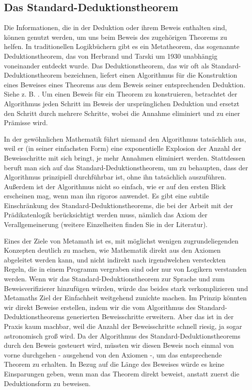 \subsection{Das Standard-Deduktionstheorem}\label{standarddeductiontheorem}

Die Informationen, die in der Deduktion oder ihrem Beweis enthalten sind, können genutzt werden, um uns beim Beweis des zugehörigen Theorems zu helfen. In traditionellen Logikbüchern gibt es ein Metatheorem, das sogenannte Deduktionstheorem, das von Herbrand und Tarski um 1930 unabhängig voneinander entdeckt wurde. Das Deduktionstheorem, das wir oft als Standard-Deduktionstheorem bezeichnen, liefert einen Algorithmus für die Konstruktion eines Beweises eines Theorems aus dem Beweis seiner entsprechenden Deduktion. Siehe z. B. \cite[S.~56]{Margaris}. Um einen Beweis für ein Theorem zu konstruieren, betrachtet der Algorithmus jeden Schritt im Beweis der ursprünglichen Deduktion und ersetzt den Schritt durch mehrere Schritte, wobei die Annahme eliminiert und zu einer Prämisse wird.

In der gewöhnlichen Mathematik führt niemand den Algorithmus tatsäch\-lich aus, weil er (in seiner einfachsten Form) eine exponentielle Explosion der Anzahl der Beweisschritte mit sich bringt, je mehr Annahmen eliminiert werden. Stattdessen beruft man sich auf das Standard-Deduktionstheorem, um zu behaupten, dass der Algorithmus prinzipiell durchführbar ist, ohne ihn tatsächlich auszuführen. Außerdem ist der Algorithmus nicht so einfach, wie er auf den ersten Blick erscheinen mag, wenn man ihn rigoros anwendet. Es gibt eine subtile Einschränkung des Standard-Deduktionstheorems, die bei der Arbeit mit der Prädikatenlogik berücksichtigt werden muss, nämlich das Axiom der Verallgemeinerung (weitere Einzelheiten finden Sie in der Literatur).

Eines der Ziele von Metamath ist es, mit möglichst wenigen zugrundeliegenden Konzepten deutlich zu machen, wie Mathematik direkt aus den Axiomen abgeleitet werden kann, und nicht indirekt nach irgendwelchen versteckten Regeln, die in einem Programm vergraben sind oder nur von Logikern verstanden werden. Wenn wir das Standard-Deduktionstheorem zur Sprache und zum Beweisverifizierer hinzufügen würden, würde das beides stark verkomplizieren und Metamaths Ziel der Einfachheit weitgehend zunichte machen. Im Prinzip könnten wir direkt Beweise erstellen, indem wir die vom Algorithmus des Standard-Deduktionstheorems generierten Beweisschritte erweitern.  Aber das ist in der Praxis kaum machbar, weil die Anzahl der Beweisschritte schnell riesig, ja sogar astronomisch groß wird. Da der Algorithmus des Standard-Deduktionstheorems durch den Beweis gesteuert wird, müssten wir diesen Beweis noch einmal von vorne durchgehen - ausgehend von den Axiomen -, um das entsprechende Theorem zu erhalten. In Bezug auf die Länge des Beweises würde es keine Einsparungen geben, wenn man das Theorem direkt beweist, anstatt zuerst die Deduktionsform zu beweisen.

